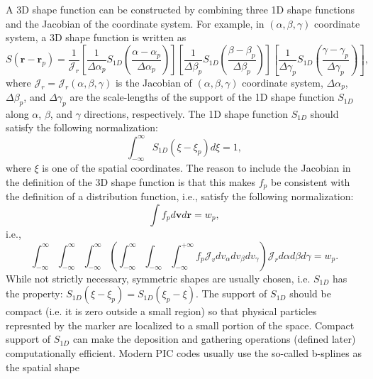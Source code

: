 \documentclass{article}
\begin{document}
A 3D shape function can be constructed by combining three 1D shape functions
and the Jacobian of the coordinate system. For example, in $(\alpha, \beta,
\gamma)$ coordinate system, a 3D shape function is written as
\begin{equation}
  \label{18-12-19-p1} S (\mathbf{r}-\mathbf{r}_p) = \frac{1}{\mathcal{J}_r}
  \left[ \frac{1}{\Delta \alpha_p} S_{1 D} \left( \frac{\alpha -
  \alpha_p}{\Delta \alpha_p} \right) \right] \left[ \frac{1}{\Delta \beta_p}
  S_{1 D} \left( \frac{\beta - \beta_p}{\Delta \beta_p} \right) \right] \left[
  \frac{1}{\Delta \gamma_p} S_{1 D} \left( \frac{\gamma - \gamma_p}{\Delta
  \gamma_p} \right) \right],
\end{equation}
where $\mathcal{J}_r = \mathcal{J}_r (\alpha, \beta, \gamma)$ is the Jacobian
of $(\alpha, \beta, \gamma)$ coordinate system, $\Delta \alpha_p$, $\Delta
\beta_p$, and $\Delta \gamma_p$ are the scale-lengths of the support of the 1D
shape function $S_{1 D}$ along $\alpha$, $\beta$, and $\gamma$ directions,
respectively. The 1D shape function $S_{1 D}$ should satisfy the following
normalization:
\begin{equation}
  \int_{- \infty}^{\infty} S_{1 D} (\xi - \xi_p) d \xi = 1,
\end{equation}
where $\xi$ is one of the spatial coordinates. The reason to include the
Jacobian in the definition of the 3D shape function is that this makes $f_p$
be consistent with the definition of a distribution function, i.e., satisfy
the following normalization:
\begin{equation}
  \int f_p d\mathbf{v}d\mathbf{r}= w_p,
\end{equation}
i.e.,
\begin{equation}
  \int_{- \infty}^{\infty} \int_{- \infty}^{\infty} \int_{- \infty}^{\infty}
  \left( \int_{- \infty}^{\infty} \int_{- \infty} \int_{- \infty}^{+ \infty}
  f_p \mathcal{J}_v d v_{\alpha} d v_{\beta} d v_{\gamma} \right)
  \mathcal{J}_r d \alpha d \beta d \gamma = w_p .
\end{equation}
While not strictly necessary, symmetric shapes are usually chosen, i.e. $S_{1
D}$ has the property: $S_{1 D} (\xi - \xi_p) = S_{1 D} (\xi_p - \xi)$. The
support of $S_{1 D}$ should be compact (i.e. it is zero outside a small
region) so that physical particles represnted by the marker are localized to a
small portion of the space. Compact support of $S_{1 D}$ can make the
deposition and gathering operations (defined later) computationally efficient.
Modern PIC codes usually use the so-called b-splines as the spatial shape
\end{document}
